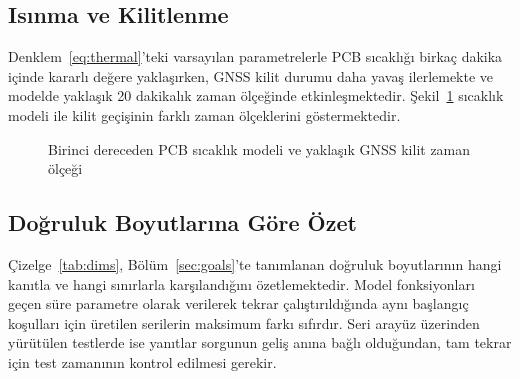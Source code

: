 \documentclass[9pt,twocolumn,a4paper]{extarticle}
\begin{document}
\subsection{Isınma ve Kilitlenme}
Denklem~\ref{eq:thermal}'teki varsayılan parametrelerle PCB sıcaklığı birkaç dakika içinde kararlı değere yaklaşırken, GNSS kilit durumu daha yavaş ilerlemekte ve modelde yaklaşık 20 dakikalık zaman ölçeğinde etkinleşmektedir. Şekil~\ref{fig:warmup} sıcaklık modeli ile kilit geçişinin farklı zaman ölçeklerini göstermektedir.

\begin{figure}[t]
\centering
{}
\caption{Birinci dereceden PCB sıcaklık modeli ve yaklaşık GNSS kilit zaman ölçeği}
\label{fig:warmup}
\end{figure}

\subsection{Doğruluk Boyutlarına Göre Özet}
Çizelge~\ref{tab:dims}, Bölüm~\ref{sec:goals}'te tanımlanan doğruluk boyutlarının hangi kanıtla ve hangi sınırlarla karşılandığını özetlemektedir. Model fonksiyonları geçen süre parametre olarak verilerek tekrar çalıştırıldığında aynı başlangıç koşulları için üretilen serilerin maksimum farkı sıfırdır. Seri arayüz üzerinden yürütülen testlerde ise yanıtlar sorgunun geliş anına bağlı olduğundan, tam tekrar için test zamanının kontrol edilmesi gerekir.
\end{document}
